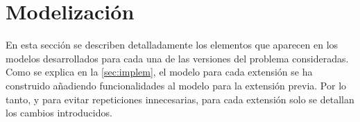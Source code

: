 
\section{Modelización} \label{sec:modelo}

En esta sección se describen detalladamente los elementos que aparecen en los 
modelos desarrollados para cada una de las versiones del problema 
consideradas. Como se explica en la \autoref{sec:implem}, el modelo para cada 
extensión se ha construido añadiendo funcionalidades al modelo para la 
extensión previa. Por lo tanto, y para evitar repeticiones innecesarias, para 
cada extensión solo se detallan los cambios introducidos.














\clearpage

